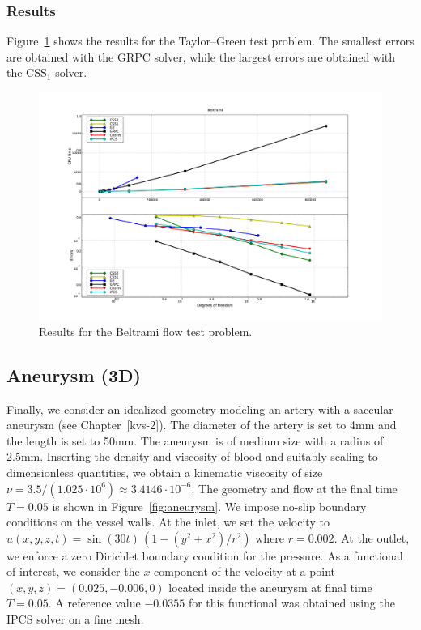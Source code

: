 \subsubsection{Results}

Figure~\ref{fig:beltrami_res} shows the results for the Taylor--Green
test problem. The smallest errors are obtained with the GRPC solver,
while the largest errors are obtained with the $\mathrm{CSS}_1$
solver.

\begin{figure}
  \begin{center}
    \includegraphics[width=14cm]{chapters/kvs-1/pdf/new_beltrami_res.pdf}
    \caption{Results for the Beltrami flow test problem.}
    \label{fig:beltrami_res}
  \end{center}
\end{figure}

\subsection{Aneurysm (3D)}

Finally, we consider an idealized geometry modeling an artery with a
saccular aneu\-rysm (see Chapter~[kvs-2]). The diameter of the artery
is set to 4mm and the length is set to 50mm. The aneurysm is of medium
size with a radius of 2.5mm. Inserting the density and viscosity of
blood and suitably scaling to dimensionless quantities, we obtain a
kinematic viscosity of size $\nu = 3.5 / (1.025 \cdot 10^6) \approx
3.4146 \cdot 10^{-6}$. The geometry and flow at the final time $T =
0.05$ is shown in Figure~\ref{fig:aneurysm}. We impose no-slip
boundary conditions on the vessel walls. At the inlet, we set the
velocity to $u(x, y, z, t) = \sin(30 t) \, (1 - (y^2 + x^2) / r^2)$
where $r = 0.002$. At the outlet, we enforce a zero Dirichlet boundary
condition for the pressure. As a functional of interest, we consider
the $x$-component of the velocity at a point $(x, y, z) = (0.025,
-0.006, 0)$ located inside the aneurysm at final time $T = 0.05$. A
reference value $-0.0355$ for this functional was obtained using the
IPCS solver on a fine mesh.


